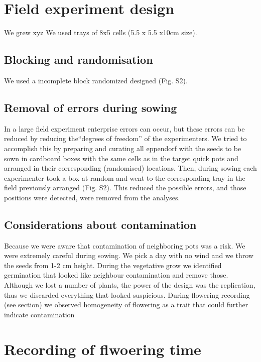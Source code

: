 \documentclass[]{article}
\begin{document}
\section{Field experiment design}\label{field-experiment-design}

We grew xyz We used trays of 8x5 cells (5.5 x 5.5 x10cm size).

\subsection{Blocking and
randomisation}\label{blocking-and-randomisation}

We used a incomplete block randomized designed (Fig. S2).

\subsection{Removal of errors during
sowing}\label{removal-of-errors-during-sowing}

In a large field experiment enterprise errors can occur, but these
errors can be reduced by reducing the``degrees of freedom'' of the
experimenters. We tried to accomplish this by preparing and curating all
eppendorf with the seeds to be sown in cardboard boxes with the same
cells as in the target quick pots and arranged in their corresponding
(randomised) locations. Then, during sowing each experimenter took a box
at random and went to the corresponding tray in the field previously
arranged (Fig. S2). This reduced the possible errors, and those
positions were detected, were removed from the analyses.

\subsection{Considerations about
contamination}\label{considerations-about-contamination}

Because we were aware that contamination of neighboring pots was a risk.
We were extremely careful during sowing. We pick a day with no wind and
we throw the seeds from 1-2 cm height. During the vegetative grow we
identified germination that looked like neighbour contamination and
remove those. Although we lost a number of plants, the power of the
design was the replication, thus we discarded everything that looked
suspicious. During flowering recording (see section) we observed
homogeneity of flowering as a trait that could further indicate
contamination

\section{Recording of flwoering time}\label{recording-of-flwoering-time}
\end{document}

